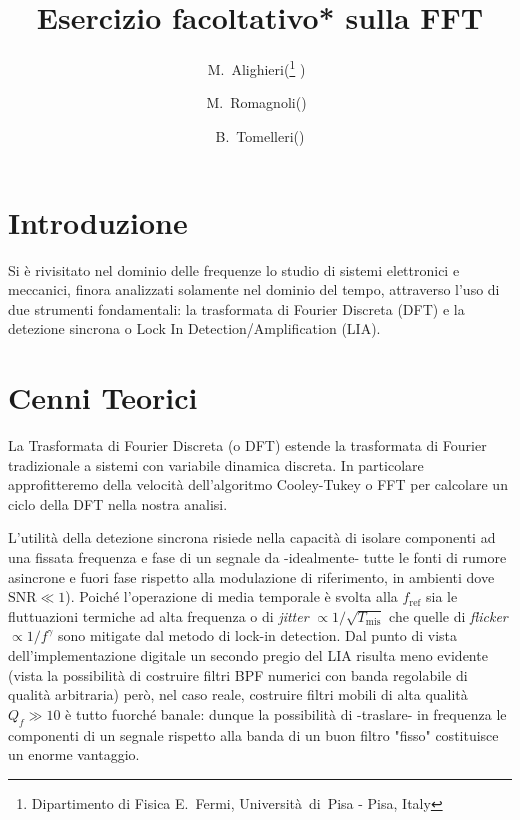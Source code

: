 \documentclass{article}[a4paper, oneside, 11pt]
\title{Esercizio facoltativo* sulla FFT}
\author{M.~Alighieri(\thanks{Dipartimento di Fisica E.~Fermi,
		Universit\`a~di~Pisa - Pisa, Italy} )~\and
		M.~Romagnoli(\protect\footnotemark[1] )~\and 
		B.~Tomelleri(\protect\footnotemark[1] )}%
\begin{document}
\maketitle

\section{Introduzione}
Si è rivisitato nel dominio delle frequenze lo studio di sistemi elettronici
e meccanici, finora analizzati solamente nel dominio del tempo, attraverso l'uso
di due strumenti fondamentali: la trasformata di Fourier Discreta (DFT) e la
detezione sincrona o Lock In Detection/Amplification (LIA).

\section{Cenni Teorici}
La Trasformata di Fourier Discreta (o DFT) estende la trasformata di Fourier
tradizionale a sistemi con variabile dinamica discreta. In particolare
approfitteremo della velocità dell'algoritmo Cooley-Tukey \cite{FFT} o FFT
per calcolare un ciclo della DFT nella nostra analisi.

L'utilità della detezione sincrona risiede nella capacità di isolare
componenti ad una fissata frequenza e fase di un segnale da -idealmente-
tutte le fonti di rumore asincrone e fuori fase rispetto alla modulazione
di riferimento, in ambienti dove $\text{SNR} \ll 1$).
Poiché l'operazione di media temporale è svolta alla $f_{\text{ref}}$ sia
le fluttuazioni termiche ad alta frequenza o di \emph{jitter}
$\propto 1/\sqrt{T_{\text{mis}}}$ che quelle di \emph{flicker}
$\propto 1/f^\gamma$ sono mitigate dal metodo di lock-in detection.
Dal punto di vista dell'implementazione digitale un secondo pregio del LIA
risulta meno evidente (vista la possibilità di costruire filtri BPF numerici
con banda regolabile di qualità arbitraria) però, nel caso reale, costruire
filtri mobili di alta qualità $Q_f \gg 10$ è tutto fuorché banale: dunque la
possibilità di -traslare- in frequenza le componenti di un segnale rispetto
alla banda di un buon filtro "fisso" costituisce un enorme vantaggio.
\end{document}
